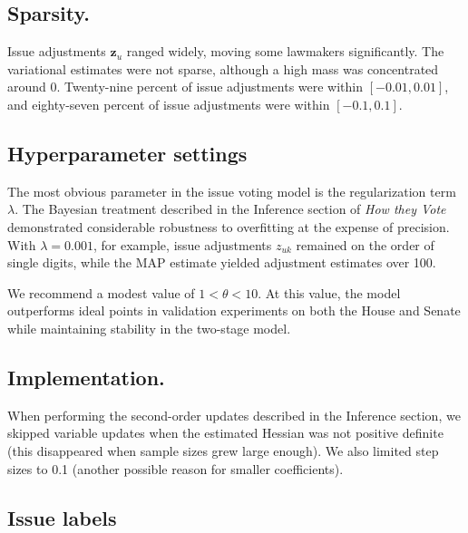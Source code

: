 \subsection*{Sparsity.}
Issue adjustments $\bm z_u$ ranged widely, moving some lawmakers
significantly. The variational estimates were not sparse, although a
high mass was concentrated around 0. Twenty-nine percent of issue
adjustments were within $[-0.01, 0.01]$, and eighty-seven percent of
issue adjustments were within $[-0.1, 0.1]$.

\subsection*{Hyperparameter settings}
The most obvious parameter in the issue voting model is the
regularization term $\lambda$. The Bayesian treatment described in
the Inference section of \emph{How they Vote} demonstrated considerable robustness
to overfitting at the expense of precision.  With $\lambda=0.001$,
for example, issue adjustments $z_{uk}$ remained on the order of single digits,
while the MAP estimate yielded adjustment estimates over 100.

We recommend a modest value of $1 < \theta < 10$.  At this value, the model
outperforms ideal points in validation experiments on both the House
and Senate while maintaining stability in the two-stage model.

\subsection*{Implementation.}

When performing the second-order updates described in
the Inference section, we skipped variable updates when the
estimated Hessian was not positive definite (this disappeared when
sample sizes grew large enough).  We also limited step sizes to 0.1
(another possible reason for smaller coefficients).

\subsection*{Issue labels}
\label{section:issue_issue_labels}

